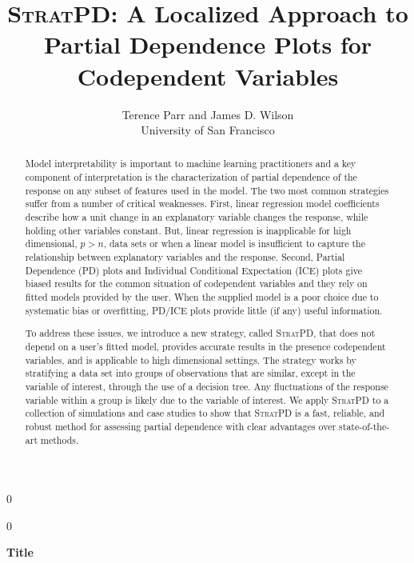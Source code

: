 \documentclass[12pt]{article}
\newcommand{\blind}{0}
\newcommand{\spd}{\fontfamily{cmr}\textsc{\small StratPD}}
\begin{document}
\def\spacingset#1{\renewcommand{\baselinestretch}%
{#1}\small\normalsize} \spacingset{1}



\blind
{
  \title{{\textsc{StratPD}}: \bf A Localized Approach to Partial Dependence Plots for Codependent Variables}

  \author{Terence Parr and James D. Wilson\\
      University of San Francisco\\
}
  \maketitle
} \fi

\blind
{
  \bigskip
  \bigskip
  \bigskip
  \begin{center}
    {\LARGE\bf Title}
\end{center}
  \medskip
} \fi

\bigskip
\begin{abstract}
Model interpretability is important to machine learning practitioners and a key component of  interpretation is the characterization of partial dependence of the response on any subset of features used in the model. The two most common strategies suffer from a number of critical weaknesses. First,  linear regression model coefficients describe how a unit change in an explanatory variable changes the response, while holding other variables constant. But, linear regression is inapplicable for high dimensional, $p>n$, data sets or when a linear model is insufficient to capture the relationship between explanatory variables and the response. Second, Partial Dependence (PD) plots and Individual Conditional Expectation (ICE) plots give biased results for the common situation of codependent variables and they rely on fitted models provided by the user. When the supplied model is a poor choice due to systematic bias or overfitting, PD/ICE plots provide little (if any) useful information.  

To address these issues, we introduce a new strategy, called \spd{}, that does not depend on a user's fitted model, provides accurate results in the presence codependent variables, and is applicable to high dimensional settings. The strategy works by stratifying a data set into groups of observations that are similar, except in the variable of interest, through the use of a decision tree. Any fluctuations of the response variable within a group is likely due to the variable of interest. We apply \spd{} to a collection of simulations and case studies to show that \spd{} is a fast, reliable, and robust method for assessing partial dependence with clear advantages over state-of-the-art methods. 
\end{abstract}
\end{document}
